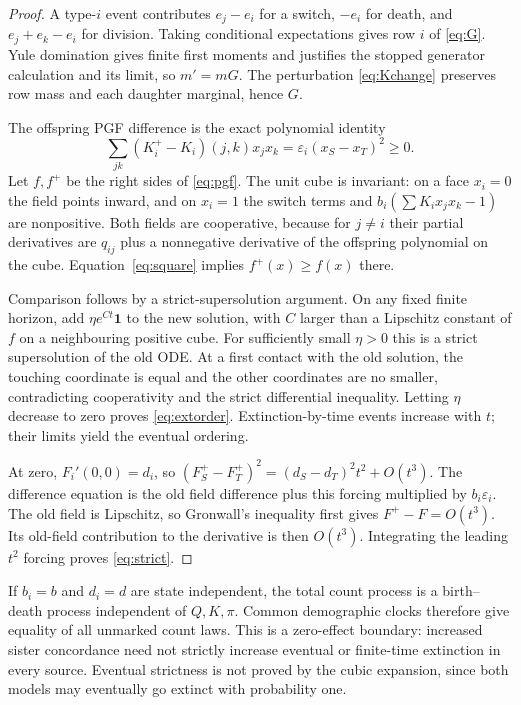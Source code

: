 \documentclass[11pt]{article}
\theoremstyle{definition}
\newcommand{\one}{\mathbf 1}
\begin{document}
\begin{proof}
A type-$i$ event contributes $e_j-e_i$ for a switch, $-e_i$ for death, and
$e_j+e_k-e_i$ for division. Taking conditional expectations gives row $i$ of
\eqref{eq:G}. Yule domination gives finite first moments and justifies the
stopped generator calculation and its limit, so $m'=mG$. The perturbation
\eqref{eq:Kchange} preserves row mass and each daughter marginal, hence $G$.

The offspring PGF difference is the exact polynomial identity
\begin{equation}\label{eq:square}
 \sum_{jk}(K_i^{+}-K_i)(j,k)x_jx_k=\varepsilon_i(x_S-x_T)^2\ge0.
\end{equation}
Let $f,f^+$ be the right sides of \eqref{eq:pgf}. The unit cube is invariant: on
a face $x_i=0$ the field points inward, and on $x_i=1$ the switch terms and
$b_i(\sum K_ix_jx_k-1)$ are nonpositive. Both fields are cooperative, because for
$j\ne i$ their partial derivatives are $q_{ij}$ plus a nonnegative derivative of
the offspring polynomial on the cube. Equation~\eqref{eq:square} implies
$f^+(x)\ge f(x)$ there.

Comparison follows by a strict-supersolution argument. On any fixed finite
horizon, add $\eta e^{Ct}\one$ to the new solution, with $C$ larger than a
Lipschitz constant of $f$ on a neighbouring positive cube. For sufficiently
small $\eta>0$ this is a strict supersolution of the old ODE. At a first contact
with the old solution, the touching coordinate is equal and the other
coordinates are no smaller, contradicting cooperativity and the strict
differential inequality. Letting $\eta$ decrease to zero proves
\eqref{eq:extorder}. Extinction-by-time events increase with $t$; their limits
yield the eventual ordering.

At zero, $F_i'(0,0)=d_i$, so $(F_S^+-F_T^+)^2=(d_S-d_T)^2t^2+O(t^3)$. The
difference equation is the old field difference plus this forcing multiplied by
$b_i\varepsilon_i$. The old field is Lipschitz, so Gronwall's inequality first
gives $F^+-F=O(t^3)$. Its old-field contribution to the derivative is then
$O(t^3)$. Integrating the leading $t^2$ forcing proves \eqref{eq:strict}.
\end{proof}

If $b_i=b$ and $d_i=d$ are state independent, the total count process is a
birth--death process independent of $Q,K,\pi$. Common demographic clocks
therefore give equality of all unmarked count laws. This is a zero-effect
boundary: increased sister concordance need not strictly increase eventual or
finite-time extinction in every source. Eventual strictness is not proved by the
cubic expansion, since both models may eventually go extinct with probability
one.
\end{document}
